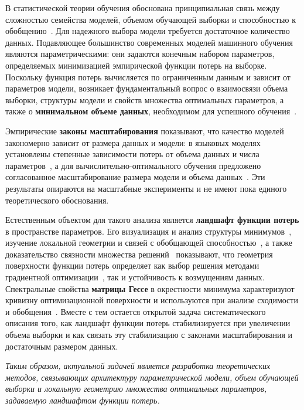 \providecommand{\extcite}[1]{\ifsynopsis\else~\cite{#1}\fi}%
{\actuality} В статистической теории обучения обоснована принципиальная связь между сложностью семейства моделей, объемом обучающей выборки и способностью к обобщению\extcite{vapnik1995nature}. Для надежного выбора модели требуется достаточное количество данных. Подавляющее большинство современных моделей машинного обучения являются параметрическими: они задаются конечным набором параметров, определяемых минимизацией эмпирической функции потерь на выборке. Поскольку функция потерь вычисляется по ограниченным данным и зависит от параметров модели, возникает фундаментальный вопрос о взаимосвязи объема выборки, структуры модели и свойств множества оптимальных параметров, а также о \textbf{минимальном объеме данных}, необходимом для успешного обучения\extcite{kaplan2020scaling,hoffmann2022}.

Эмпирические \textbf{законы масштабирования} показывают, что качество моделей закономерно зависит от размера данных и модели: в языковых моделях установлены степенные зависимости потерь от объема данных и числа параметров\extcite{kaplan2020scaling}, а для вычислительно-оптимального обучения предложено согласованное масштабирование размера модели и объема данных\extcite{hoffmann2022}. Эти результаты опираются на масштабные эксперименты и не имеют пока единого теоретического обоснования.

Естественным объектом для такого анализа является \textbf{ландшафт функции потерь} в пространстве параметров. Его визуализация и анализ структуры минимумов\extcite{li2018visualizing}, изучение локальной геометрии и связей с обобщающей способностью\extcite{fort2019large}, а также доказательство связности множества решений\extcite{draxler2018essentially} показывают, что геометрия поверхности функции потерь определяет как выбор решения методами градиентной оптимизации\extcite{garipov2018loss,chaudhari2019}, так и устойчивость к возмущениям данных. Спектральные свойства \textbf{матрицы Гессе} в окрестности минимума характеризуют кривизну оптимизационной поверхности и используются при анализе сходимости и обобщения\extcite{papyan2019}. Вместе с тем остается открытой задача систематического описания того, как ландшафт функции потерь стабилизируется при увеличении объема выборки и как связать эту стабилизацию с законами масштабирования и достаточным размером данных.

\ifsynopsis\textit{Таким образом, актуальной задачей является разработка теоретических методов, связывающих архитектуру параметрической модели, объем обучающей выборки и локальную геометрию множества оптимальных параметров, задаваемую ландшафтом функции потерь.}\fi

